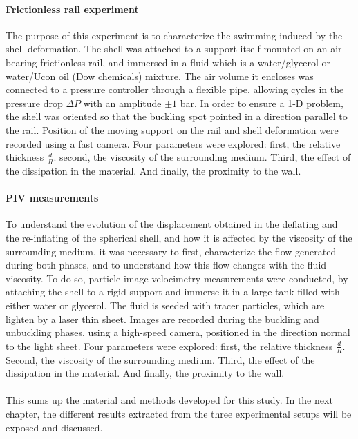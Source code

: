 \paragraph{Frictionless rail experiment}
The purpose of this experiment is to characterize the swimming induced by the shell deformation.
The shell was attached to a support itself mounted on an air bearing frictionless rail, and immersed in a fluid which is a water/glycerol or water/Ucon oil (Dow chemicals) mixture. The air volume it encloses was connected to a pressure controller through a flexible pipe, allowing cycles in the pressure drop $\Delta P$ with an amplitude $\pm 1$ bar. In order to ensure a 1-D problem, the shell was oriented so that the buckling spot pointed in a direction parallel to the rail. Position of the moving support on the rail and shell deformation were recorded using a fast camera. Four parameters were explored: first, the relative thickness $\frac{d}{R}$. second, the viscosity of the surrounding medium. Third, the effect of the dissipation in the material. And finally, the proximity to the wall.

\paragraph{PIV measurements}
To understand the evolution of the displacement obtained in the deflating and the re-inflating of the spherical shell, and how it is affected by the viscosity of the surrounding medium, it was necessary to first, characterize the flow generated during both phases, and to understand how this flow changes with the fluid viscosity. To do so, particle image velocimetry measurements were conducted, by attaching the shell to a rigid support and immerse it in a large tank filled with either water or glycerol. The fluid is seeded with tracer particles, which are lighten by a laser thin sheet. Images are recorded during the buckling and unbuckling phases, using a high-speed camera, positioned in the direction normal to the light sheet. Four parameters were explored: first, the relative thickness $\frac{d}{R}$. Second, the viscosity of the surrounding medium. Third, the effect of the dissipation in the material. And finally, the proximity to the wall.

\paragraph{}
This sums up the material and methods developed for this study. In the next chapter, the different results extracted from the three experimental setups will be exposed and discussed. 







  

  
 



 